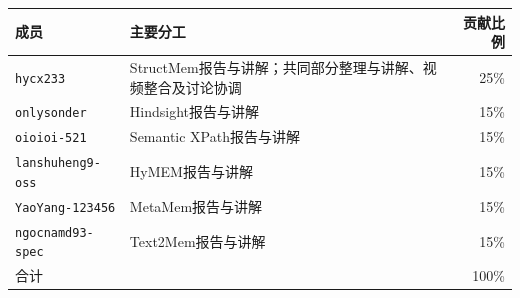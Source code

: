 \documentclass{jos}
\begin{document}
\begin{center}
\begin{tabularx}{\textwidth}{@{}p{30mm}>{\raggedright\arraybackslash}Xr@{}}
\toprule
成员 & 主要分工 & 贡献比例 \\
\midrule
\texttt{hycx233} & StructMem报告与讲解；共同部分整理与讲解、视频整合及讨论协调 & 25\% \\
\texttt{onlysonder} & Hindsight报告与讲解 & 15\% \\
\texttt{oioioi-521} & Semantic XPath报告与讲解 & 15\% \\
\texttt{lanshuheng9-oss} & HyMEM报告与讲解 & 15\% \\
\texttt{YaoYang-123456} & MetaMem报告与讲解 & 15\% \\
\texttt{ngocnamd93-spec} & Text2Mem报告与讲解 & 15\% \\
\midrule
合计 & & 100\% \\
\bottomrule
\end{tabularx}
\end{center}
\end{document}
